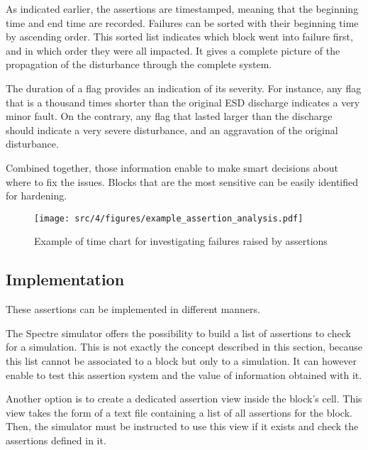 As indicated earlier, the assertions are timestamped, meaning that the beginning time and end time are recorded.
Failures can be sorted with their beginning time by ascending order.
This sorted list indicates which block went into failure first, and in which order they were all impacted.
It gives a complete picture of the propagation of the disturbance through the complete system.

The duration of a flag provides an indication of its severity.
For instance, any flag that is a thousand times shorter than the original \gls{ESD} discharge indicates a very minor fault.
On the contrary, any flag that lasted larger than the discharge should indicate a very severe disturbance, and an aggravation of the original disturbance.

Combined together, those information enable to make smart decisions about where to fix the issues.
Blocks that are the most sensitive can be easily identified for hardening.

\begin{figure}[!h]
  \centering
  \texttt{[image: src/4/figures/example\_assertion\_analysis.pdf]}
  \caption{Example of time chart for investigating failures raised by assertions}
  \label{fig:ex-special-cells}
\end{figure}


\subsection{Implementation}

These assertions can be implemented in different manners.

The Spectre simulator offers the possibility to build a list of assertions to check for a simulation.
This is not exactly the concept described in this section, because this list cannot be associated to a block but only to a simulation.
It can however enable to test this assertion system and the value of information obtained with it.

Another option is to create a dedicated assertion view inside the block's cell.
This view takes the form of a text file containing a list of all assertions for the block.
Then, the simulator must be instructed to use this view if it exists and check the assertions defined in it.

